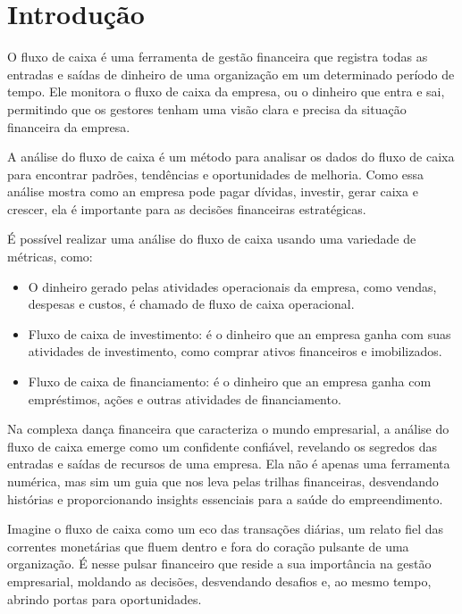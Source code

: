 \chapter{Introdução}\label{chp:introduction}
\thispagestyle{headings}
\hspace{0.7cm}O fluxo de caixa é uma ferramenta de gestão financeira que 
registra todas as entradas e saídas de dinheiro de uma organização em um 
determinado período de tempo. Ele monitora o fluxo de caixa da empresa, 
ou o dinheiro que entra e sai, permitindo que os gestores tenham uma visão 
clara e precisa da situação financeira da empresa.

A análise do fluxo de caixa é um método para analisar os dados do fluxo de 
caixa para encontrar padrões, tendências e oportunidades de melhoria. Como 
essa análise mostra como an empresa pode pagar dívidas, investir, gerar caixa 
e crescer, ela é importante para as decisões financeiras estratégicas.

É possível realizar uma análise do fluxo de caixa usando uma variedade de 
métricas, como:

\begin{itemize}
\item O dinheiro gerado pelas atividades operacionais da empresa, como vendas, 
despesas e custos, é chamado de fluxo de caixa operacional.
\item Fluxo de caixa de investimento: é o dinheiro que an empresa ganha com suas 
atividades de investimento, como comprar ativos financeiros e imobilizados.
\item Fluxo de caixa de financiamento: é o dinheiro que an empresa ganha com 
empréstimos, ações e outras atividades de financiamento.
\end{itemize}

Na complexa dança financeira que caracteriza o mundo empresarial, 
a análise do fluxo de caixa emerge como um confidente confiável, revelando os 
segredos das entradas e saídas de recursos de uma empresa. Ela não é apenas uma 
ferramenta numérica, mas sim um guia que nos leva pelas trilhas financeiras, 
desvendando histórias e proporcionando insights essenciais para a saúde do 
empreendimento.

Imagine o fluxo de caixa como um eco das transações diárias, um relato fiel das 
correntes monetárias que fluem dentro e fora do coração pulsante de uma organização. 
É nesse pulsar financeiro que reside a sua importância na gestão empresarial, 
moldando as decisões, desvendando desafios e, ao mesmo tempo, abrindo portas para 
oportunidades.

